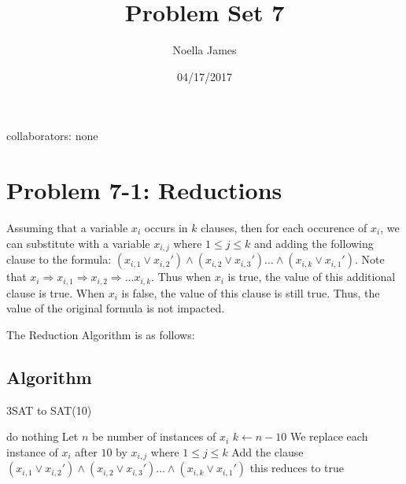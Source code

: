 \documentclass{article}
\theoremstyle{definition}
\theoremstyle{remark}
\theoremstyle{plain}
\begin{document}
\title{Problem Set 7}
\date{04/17/2017}
\author{Noella James}
\maketitle
collaborators: none\\

\section*{Problem 7-1: Reductions}

Assuming that a variable $x_i$ occurs in $k$ clauses, then for each occurence of $x_i$, we can substitute with a variable $x_{i,j}$ where $1 \leq j \leq k$ and adding the following clause to the formula: $(x_{i,1} \vee x_{i,2}') \wedge (x_{i,2} \vee x_{i,3}') \ldots \wedge (x_{i,k} \vee x_{i,1}')$. Note that $x_i \Rightarrow x_{i,1} \Rightarrow x_{i,2} \Rightarrow \ldots x_{i,k}.$ Thus when $x_i$ is true, the value of this additional clause is true. When $x_i$ is false, the value of this clause is still true. Thus, the value of the original formula is not impacted.

The Reduction Algorithm is as follows:

\subsection*{Algorithm}

\begin{algorithm}
\caption{3SAT to SAT(10)}\label{Polynomial time reduction from 3SAT to SAT(10)}
\begin{algorithmic}[1]
 
			\State do nothing
		\Else 
				\State Let $n$ be number of instances of $x_i$
				\State $k \gets n-10$
				\State We replace each instance of $x_i$ after $10$ by $x_{i,j}$ where $1 \leq j \leq k$
				\State Add the clause $(x_{i,1} \vee x_{i,2}') \wedge (x_{i,2} \vee x_{i,3}') \ldots \wedge (x_{i,k} \vee x_{i,1}')$
				\State this reduces to true
			\EndFor
		\EndIf
	\EndFor
\EndProcedure

\end{algorithmic}
\end{algorithm}
\end{document}
